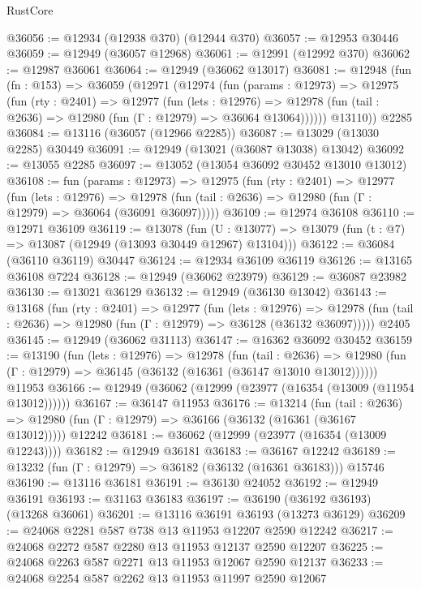 \begin{lexlean}{RustCore}
\begin{coremodule}
@36056 := @12934 (@12938 @370) (@12944 @370)
@36057 := @12953 @30446
@36059 := @12949 (@36057 @12968)
@36061 := @12991 (@12992 @370)
@36062 := @12987 @36061
@36064 := @12949 (@36062 @13017)
@36081 := @12948
    (fun (fn : @153) =>
    @36059
      (@12971
        (@12974
          (fun (params : @12973) =>
          @12975
            (fun (rty : @2401) =>
            @12977
              (fun (lets : @12976) =>
              @12978 (fun (tail : @2636) => @12980 (fun (Γ : @12979) => @36064 @13064))))))
        @13110))
    @2285
@36084 := @13116 (@36057 (@12966 @2285))
@36087 := @13029 (@13030 @2285) @30449
@36091 := @12949 (@13021 (@36087 @13038) @13042)
@36092 := @13055 @2285
@36097 := @13052 (@13054 @36092 @30452 @13010 @13012)
@36108 := fun (params : @12973) =>
  @12975
    (fun (rty : @2401) =>
    @12977
      (fun (lets : @12976) =>
      @12978 (fun (tail : @2636) => @12980 (fun (Γ : @12979) => @36064 (@36091 @36097)))))
@36109 := @12974 @36108
@36110 := @12971 @36109
@36119 := @13078
    (fun (U : @13077) => @13079 (fun (t : @7) => @13087 (@12949 (@13093 @30449 @12967) @13104)))
@36122 := @36084 (@36110 @36119) @30447
@36124 := @12934 @36109 @36119
@36126 := @13165 @36108 @7224
@36128 := @12949 (@36062 @23979)
@36129 := @36087 @23982
@36130 := @13021 @36129
@36132 := @12949 (@36130 @13042)
@36143 := @13168
    (fun (rty : @2401) =>
    @12977
      (fun (lets : @12976) =>
      @12978 (fun (tail : @2636) => @12980 (fun (Γ : @12979) => @36128 (@36132 @36097)))))
    @2405
@36145 := @12949 (@36062 @31113)
@36147 := @16362 @36092 @30452
@36159 := @13190
    (fun (lets : @12976) =>
    @12978
      (fun (tail : @2636) =>
      @12980 (fun (Γ : @12979) => @36145 (@36132 (@16361 (@36147 @13010 @13012))))))
    @11953
@36166 := @12949 (@36062 (@12999 (@23977 (@16354 (@13009 (@11954 @13012))))))
@36167 := @36147 @11953
@36176 := @13214
    (fun (tail : @2636) => @12980 (fun (Γ : @12979) => @36166 (@36132 (@16361 (@36167 @13012)))))
    @12242
@36181 := @36062 (@12999 (@23977 (@16354 (@13009 @12243))))
@36182 := @12949 @36181
@36183 := @36167 @12242
@36189 := @13232 (fun (Γ : @12979) => @36182 (@36132 (@16361 @36183))) @15746
@36190 := @13116 @36181
@36191 := @36130 @24052
@36192 := @12949 @36191
@36193 := @31163 @36183
@36197 := @36190 (@36192 @36193) (@13268 @36061)
@36201 := @13116 @36191 @36193 (@13273 @36129)
@36209 := @24068 @2281 @587 @738 @13 @11953 @12207 @2590 @12242
@36217 := @24068 @2272 @587 @2280 @13 @11953 @12137 @2590 @12207
@36225 := @24068 @2263 @587 @2271 @13 @11953 @12067 @2590 @12137
@36233 := @24068 @2254 @587 @2262 @13 @11953 @11997 @2590 @12067

\end{coremodule}
\end{lexlean}
